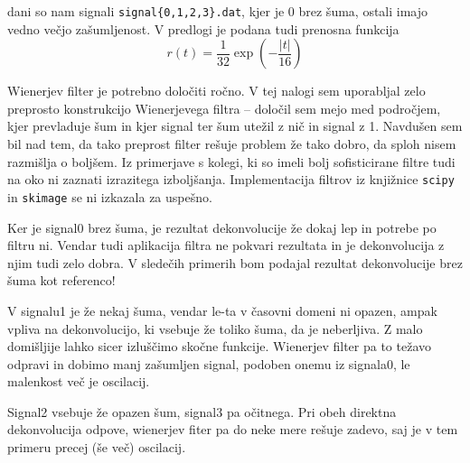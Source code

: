 dani so nam signali \texttt{signal\{0,1,2,3\}.dat}, kjer je 0 brez šuma, ostali imajo vedno večjo zašumljenost. V predlogi je podana tudi prenosna funkcija
\begin{equation}
    r(t) = \frac{1}{32} \exp{\left( -\frac{|t|}{16} \right)}
\end{equation}

Wienerjev filter je potrebno določiti ročno. V tej nalogi sem uporabljal zelo preprosto konstrukcijo Wienerjevega filtra -- določil sem mejo med področjem, kjer prevladuje šum in kjer signal ter šum utežil z nič in signal z 1. Navdušen sem bil nad tem, da tako preprost filter rešuje problem že tako dobro, da sploh nisem razmišlja o boljšem. Iz primerjave s kolegi, ki so imeli bolj sofisticirane filtre tudi na oko ni zaznati izrazitega izboljšanja. Implementacija filtrov iz knjižnice \texttt{scipy} in \texttt{skimage} se ni izkazala za uspešno.

Ker je signal0 brez šuma, je rezultat dekonvolucije že dokaj lep in potrebe po filtru ni. Vendar tudi aplikacija filtra ne pokvari rezultata in je dekonvolucija z njim tudi zelo dobra. V sledečih primerih bom podajal rezultat dekonvolucije brez šuma kot referenco!

V signalu1 je že nekaj šuma, vendar le-ta v časovni domeni ni opazen, ampak vpliva na dekonvolucijo, ki vsebuje že toliko šuma, da je neberljiva. Z malo domišljije lahko sicer izluščimo skočne funkcije. Wienerjev filter pa to težavo odpravi in dobimo manj zašumljen signal, podoben onemu iz signala0, le malenkost več je oscilacij.

Signal2 vsebuje že opazen šum, signal3 pa očitnega. Pri obeh direktna dekonvolucija odpove, wienerjev fiter pa do neke mere rešuje zadevo, saj je v tem primeru precej (še več) oscilacij.


